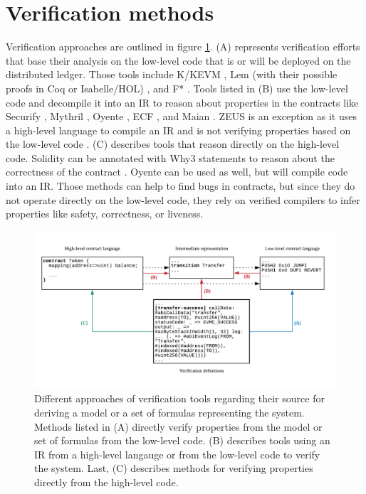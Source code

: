 \section{Verification methods}
\label{verification}

Verification approaches are outlined in figure \ref{fig:verification}. 
(A) represents verification efforts that base their analysis on the low-level code that is or will be deployed on the distributed ledger. Those tools include K/KEVM \cite{Hildenbrandt2017}, Lem (with their possible proofs in Coq or Isabelle/HOL) \cite{Hirai2017}, and F* \cite{Bhargavan2016,Grishchenko2018}.
Tools listed in (B) use the low-level code and decompile it into an IR to reason about properties in the contracts like Securify \cite{Tsankov2017}, Mythril \cite{Mueller2018}, Oyente \cite{Luu2016,Albert2018}, ECF \cite{Grossman2017}, and Maian \cite{Nikolic2018}. ZEUS is an exception as it uses a high-level language to compile an IR and is not verifying properties based on the low-level code \cite{Kalra2018}.
(C) describes tools that reason directly on the high-level code. Solidity can be annotated with Why3 statements to reason about the correctness of the contract \cite{Reitwiessner2015Why3}. Oyente can be used as well, but will compile code into an IR. Those methods can help to find bugs in contracts, but since they do not operate directly on the low-level code, they rely on verified compilers to infer properties like safety, correctness, or liveness.


\begin{figure}
\label{fig:verification}
\includegraphics[width=\textwidth]{fig/Verification.pdf}
\caption{Different approaches of verification tools regarding their source for deriving a model or a set of formulas representing the system. Methods listed in (A) directly verify properties from the model or set of formulas from the low-level code. (B) describes tools using an IR from a high-level langauge or from the low-level code to verify the system. Last, (C) describes methods for verifying properties directly from the high-level code.}
\end{figure}

